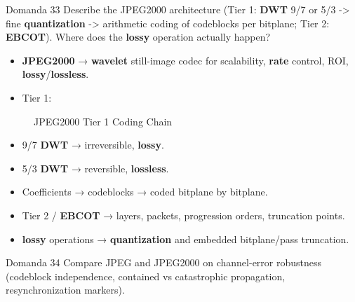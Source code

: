 \begin{questionbox}{Domanda 33}
Describe the JPEG2000 architecture (Tier 1: \textbf{DWT} 9/7 or 5/3 -> fine \textbf{quantization} -> arithmetic coding of codeblocks per bitplane; Tier 2: \textbf{EBCOT}). Where does the \textbf{lossy} operation actually happen?
\end{questionbox}


\begin{itemize}
  \item \textbf{JPEG2000} → \textbf{wavelet} still-image codec for scalability, \textbf{rate} control, ROI, \textbf{lossy}/\textbf{lossless}.
  \item Tier 1:
\end{itemize}


\begin{figure}[H]
\centering
{}
\caption{JPEG2000 Tier 1 Coding Chain}
\end{figure}


\begin{itemize}
  \item 9/7 \textbf{DWT} → irreversible, \textbf{lossy}.
  \item 5/3 \textbf{DWT} → reversible, \textbf{lossless}.
  \item Coefficients → codeblocks → coded bitplane by bitplane.
  \item Tier 2 / \textbf{EBCOT} → layers, packets, progression orders, truncation points.
  \item \textbf{lossy} operations → \textbf{quantization} and embedded bitplane/pass truncation.
\end{itemize}



\begin{questionbox}{Domanda 34}
Compare JPEG and JPEG2000 on channel-error robustness (codeblock independence, contained vs catastrophic propagation, resynchronization markers).
\end{questionbox}



